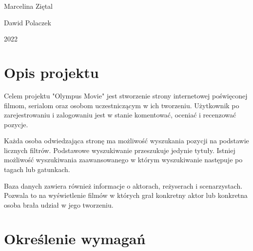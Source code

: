 \documentclass[12pt]{article}
\begin{document}
\begin{titlepage}
\begin{minipage}{0.4\textwidth}
\begin{flushright}
			Marcelina Ziętal
			
			Dawid Polaczek
		\end{flushright}
	\end{minipage}
	
	
	\vspace{\fill}
	2022
	
	
	
\end{titlepage}
	
	\tableofcontents
	\pagebreak
	

	\section{Opis projektu}
	Celem projektu "Olympus Movie" jest stworzenie strony internetowej poświęconej filmom, serialom oraz osobom uczestniczącym w ich tworzeniu. Użytkownik po zarejestrowaniu i zalogowaniu jest w stanie komentować, oceniać i recenzować pozycje.
	
	Każda osoba odwiedzająca stronę ma możliwość wyszukania pozycji na podstawie licznych filtrów. Podstawowe wyszukiwanie przeszukuje jedynie tytuły. Istniej możliwość wyszukiwania zaawansowanego w którym wyszukiwanie następuje po tagach lub gatunkach.
	
	Baza danych zawiera również informacje o aktorach, reżyserach i scenarzystach. Pozwala to na wyświetlenie filmów w których grał konkretny aktor lub konkretna osoba brała udział w jego tworzeniu.
	\section{Określenie wymagań}
\end{document}
